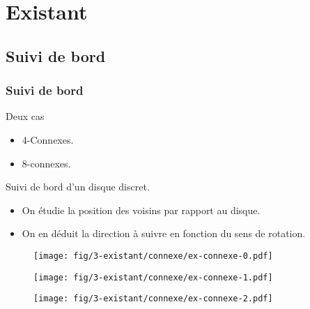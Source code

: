 \section{Existant}

\subsection{Suivi de bord}
\begin{frame}
  \frametitle{Suivi de bord}
    { 
      \begin{block}{Deux cas}
        \begin{itemize}
          \item 4-Connexes.
          \item 8-connexes.
        \end{itemize}
      \end{block} 
    } 
    {
      \begin{block}{Suivi de bord d'un disque discret.}
        \begin{itemize}
          \item On étudie la position des voisins par rapport au disque.
          \item<3> On en déduit la direction à suivre en fonction du sens de rotation.
        \end{itemize}
      \end{block} 
    }
    
    {   
      \begin{figure}[h!]
        \centering
        \texttt{[image: fig/3-existant/connexe/ex-connexe-0.pdf]}
      \end{figure}    
    }
    {     
      \begin{figure}[h!]
        \centering
        \texttt{[image: fig/3-existant/connexe/ex-connexe-1.pdf]}
      \end{figure}    
    }
    {     
      \begin{figure}[h!]
        \centering
        \texttt{[image: fig/3-existant/connexe/ex-connexe-2.pdf]}
      \end{figure}    
    }
\end{frame}

